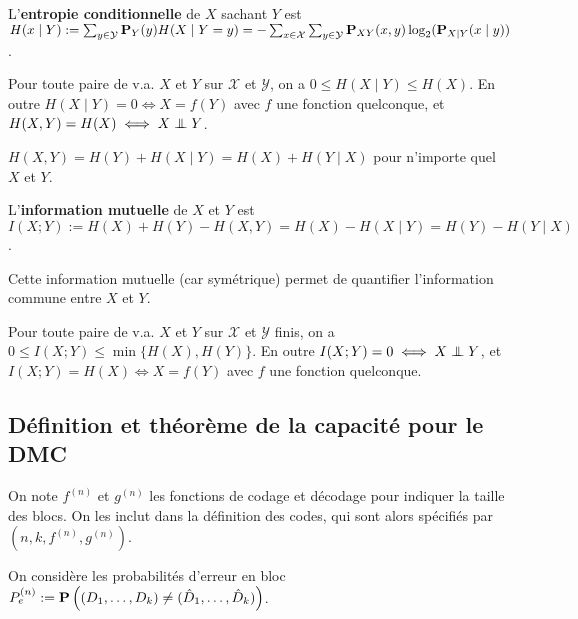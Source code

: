	\begin{defn}
		L'\textbf{entropie conditionnelle} de $X$ sachant $Y$ est\\
		$H(x \mid Y) := \sum_{y \in \mathcal{Y}} \mathbf{P}_Y(y) H(X \mid Y = y) = - \sum_{x \in \mathcal{X}} \sum_{y \in \mathcal{Y}} \mathbf{P}_{XY}(x,y) \log_2(\mathbf{P}_{X \mid Y} (x \mid y))$.
	\end{defn}

	\begin{pop}
		Pour toute paire de v.a. $X$ et $Y$ sur $\mathcal{X}$ et $\mathcal{Y}$, on a
		$0 \leq H(X \mid Y) \leq H(X)$.
		En outre $H(X \mid Y) = 0 \iff X = f(Y)$ avec $f$ une fonction quelconque, et $H(X,Y) = H(X) \iff X \indep Y$.
	\end{pop}

	\begin{pop}
		$H(X,Y) = H(Y) + H(X \mid Y) = H(X) + H(Y \mid X)$ pour n'importe quel $X$ et $Y$.
	\end{pop}

	\begin{defn}
		L'\textbf{information mutuelle} de $X$ et $Y$ est $I(X;Y) := H(X) + H(Y) - H(X,Y) = H(X) - H(X \mid Y) = H(Y) - H(Y \mid X)$.
	\end{defn}

	Cette information mutuelle (car symétrique) permet de quantifier l'information commune entre $X$ et $Y$.

	\begin{pop}
		Pour toute paire de v.a. $X$ et $Y$ sur $\mathcal{X}$ et $\mathcal{Y}$ finis, on a
		$0 \leq I(X;Y) \leq \min \{ H(X),H(Y) \}$.
		En outre $I(X;Y) = 0 \iff X \indep Y$, et $I(X;Y) = H(X) \iff X = f(Y)$ avec $f$ une fonction quelconque.
	\end{pop}

\subsection{Définition et théorème de la capacité pour le DMC}

	\begin{note}
		On note $f^{(n)}$ et $g^{(n)}$ les fonctions de codage et décodage pour indiquer la taille des blocs.
		On les inclut dans la définition des codes, qui sont alors spécifiés par $(n,k,f^{(n)},g^{(n)})$.
	\end{note}

	On considère les probabilités d'erreur en bloc $P_e^{(n)} := \mathbf{P} \left( (D_1,\ldots,D_k) \neq (\hat{D}_1,\ldots,\hat{D}_k) \right)$.

